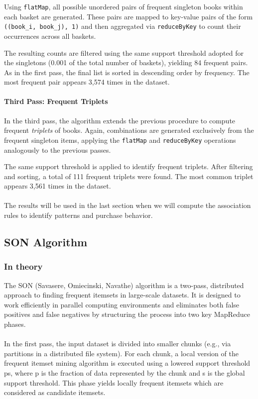 \documentclass[a4paper,12pt]{article}
\begin{document}
Using \texttt{flatMap}, all possible unordered pairs of frequent singleton books within each basket are generated. These pairs are mapped to key-value pairs of the form \texttt{((book\_i, book\_j), 1)} and then aggregated via \texttt{reduceByKey} to count their occurrences across all baskets.

The resulting counts are filtered using the same support threshold adopted for the singletons (0.001 of the total number of baskets), yielding 84 frequent pairs. As in the first pass, the final list is sorted in descending order by frequency. The most frequent pair appears 3,574 times in the dataset.

\paragraph{Third Pass: Frequent Triplets}

In the third pass, the algorithm extends the previous procedure to compute frequent \textit{triplets} of books. Again, combinations are generated exclusively from the frequent singleton items, applying the \texttt{flatMap} and \texttt{reduceByKey} operations analogously to the previous passes.

The same support threshold is applied to identify frequent triplets. After filtering and sorting, a total of 111 frequent triplets were found. The most common triplet appears 3,561 times in the dataset.
\paragraph{}
The results will be used in the last section when we will compute the association rules to identify patterns and purchase behavior. 


\newpage

\subsection{SON Algorithm}

\subsubsection{In theory}
The SON (Savasere, Omiecinski, Navathe) algorithm is a two-pass, distributed approach to finding frequent itemsets in large-scale datasets. It is designed to work efficiently in parallel computing environments and eliminates both false positives and false negatives by structuring the process into two key MapReduce phases.
\paragraph{}
In the first pass, the input dataset is divided into smaller chunks (e.g., via partitions in a distributed file system). For each chunk, a local version of the frequent itemset mining algorithm is executed using a lowered support threshold ps, where p is the fraction of data represented by the chunk and s is the global support threshold. This phase yields locally frequent itemsets which are considered as candidate itemsets.
\end{document}
